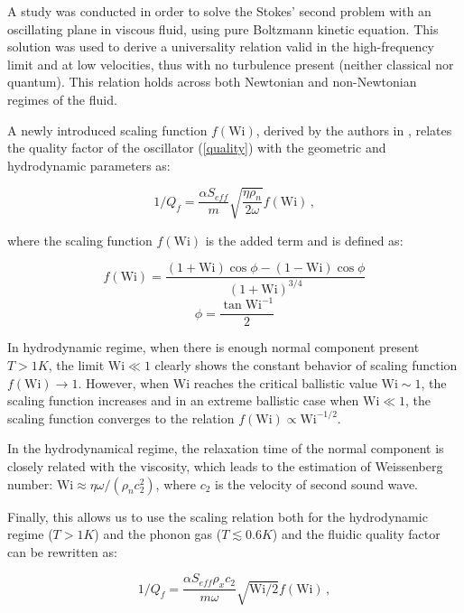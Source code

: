 A study was conducted in order to solve the Stokes' second problem with an oscillating plane in viscous fluid, using pure Boltzmann kinetic equation. This solution was used to derive a universality relation valid in the high-frequency limit and at low velocities, thus with no turbulence present (neither classical nor quantum). This relation holds across both Newtonian and non-Newtonian regimes of the fluid.

A newly introduced scaling function $f(\text{Wi})$, derived by the authors in \cite{universal_scaling}, relates the quality factor of the oscillator (\ref{quality}) with the geometric and hydrodynamic parameters as:

\begin{equation}
1 / Q_f = \frac{\alpha S_{eff}}{m} \sqrt{\frac{\eta \rho_n}{2\omega}} f(\text{Wi})\,,
\label{scaling_function}
\end{equation}

where the scaling function $f(\text{Wi})$ is the added term and is defined as:

\begin{equation}
f(\text{Wi}) = \frac{(1 + \text{Wi}) \cos{\phi} - (1 - \text{Wi}) \cos{\phi}}{(1+\text{Wi})^{3/4}}
\end{equation}
\begin{equation}
\phi = \frac{\tan{\text{Wi}^{-1}}}{2}
\end{equation}

In hydrodynamic regime, when there is enough normal component present $T > 1\unit{K}$, the limit $\text{Wi} \ll 1$ clearly shows the constant behavior of scaling function $f(\text{Wi}) \rightarrow 1$. However, when Wi reaches the critical ballistic value $\text{Wi} \sim 1$, the scaling function increases and in an extreme ballistic case when $\text{Wi} \ll 1$, the scaling function converges to the relation $f(\text{Wi}) \propto \text{Wi}^{-1/2}$.

In the hydrodynamical regime, the relaxation time of the normal component is closely related with the viscosity, which leads to the estimation of Weissenberg number: $\text{Wi} \approx \eta \omega / (\rho_n c_2^2)$, where $c_2$ is the velocity of second sound wave.

Finally, this allows us to use the scaling relation both for the hydrodynamic regime ($T > 1\unit{K}$) and the phonon gas ($T \lesssim 0.6\unit{K}$) and the fluidic quality factor can be rewritten as:

\begin{equation}
1 / Q_f = \frac{\alpha S_{eff} \rho_x c_2}{m\omega} \sqrt{\text{Wi}/2} f(\text{Wi})\,,
\end{equation}

